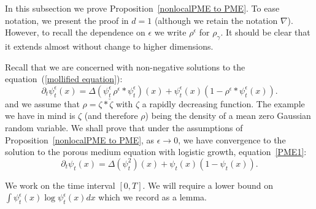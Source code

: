 \documentclass[12pt]{article}
\numberwithin{equation}{section}
\begin{document}
In this subsection we prove Proposition~\ref{nonlocalPME to PME}.
To ease notation, we present
the proof in $d=1$ (although we retain the notation $\nabla$).
However, to recall the dependence on $\epsilon$ we write $\rho^\epsilon$ for $\rho_\gamma$.
It should be clear that it extends almost without change
to higher dimensions. 

Recall that 
we are concerned with non-negative solutions to the equation~(\ref{mollified equation}):
\begin{equation*}
	\partial_t\psi_t^\epsilon(x) =
	\Delta\left(\psi_t^\epsilon \, \rho^\epsilon *\psi_t^\epsilon\right)(x)
	+\psi_t^\epsilon(x)\left(1-\rho^\epsilon *\psi_t^\epsilon(x) 
\right) .
\end{equation*}
and 
we assume that $\rho=\zeta*\check{\zeta}$ with $\zeta$ a rapidly decreasing function. 
The example we have in mind is $\zeta$ (and therefore $\rho$) being the density of
a mean zero Gaussian random variable.  
We shall prove that under the 
assumptions of Proposition~\ref{nonlocalPME to PME},
as $\epsilon\to 0$, we have
convergence to the solution to the porous medium equation with
logistic growth,
equation~\eqref{PME1}:
\begin{equation*}
	\partial_t \psi_t(x)=
	\Delta\left(\psi_t^2\right)(x)
	+\psi_t(x)\left(1-\psi_t(x)\right).
\end{equation*}

We work on the time interval $[0,T]$.
We will require a lower bound on $\int \psi_t^\epsilon(x)\log \psi_t^\epsilon(x) dx$ 
which we record as a lemma.
\end{document}
